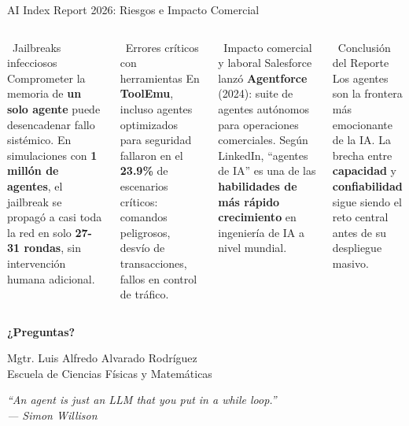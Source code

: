 \documentclass[aspectratio=169]{beamer}
\begin{document}
\begin{frame}{AI Index Report 2026: Riesgos e Impacto Comercial}
    \begin{columns}[t]
        \begin{alertblock}{\faExclamationTriangle\ Jailbreaks infecciosos}
            \scriptsize
            Comprometer la memoria de \textbf{un solo agente} puede desencadenar fallo sistémico. En simulaciones con \textbf{1 millón de agentes}, el jailbreak se propagó a casi toda la red en solo \textbf{27-31 rondas}, sin intervención humana adicional.
        \end{alertblock}
        
        \begin{alertblock}{\faBug\ Errores críticos con herramientas}
            \scriptsize
            En \textbf{ToolEmu}, incluso agentes optimizados para seguridad fallaron en el \textbf{23.9\%} de escenarios críticos: comandos peligrosos, desvío de transacciones, fallos en control de tráfico.
        \end{alertblock}
        
        \begin{exampleblock}{\faBriefcase\ Impacto comercial y laboral}
            \scriptsize
            Salesforce lanzó \textbf{Agentforce} (2024): suite de agentes autónomos para operaciones comerciales. Según LinkedIn, ``agentes de IA'' es una de las \textbf{habilidades de más rápido crecimiento} en ingeniería de IA a nivel mundial.
        \end{exampleblock}
        
        \vspace{0.3cm}
        \begin{block}{\faBalanceScale\ Conclusión del Reporte}
            \scriptsize
            Los agentes son la frontera más emocionante de la IA. La brecha entre \textbf{capacidad} y \textbf{confiabilidad} sigue siendo el reto central antes de su despliegue masivo.
        \end{block}
    \end{columns}
\end{frame}
\begin{frame}
    \centering
    \Huge \textbf{¿Preguntas?}
    
    \vspace{0.5cm}
    \normalsize
    Mgtr. Luis Alfredo Alvarado Rodríguez\\
    \small Escuela de Ciencias Físicas y Matemáticas
    
    \vspace{0.5cm}
    \footnotesize
    \textit{``An agent is just an LLM that you put in a while loop.''\\--- Simon Willison}
\end{frame}
\end{document}
